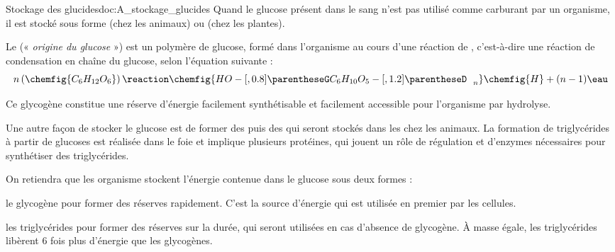 \begin{doc}{Stockage des glucides}{doc:A_stockage_glucides}
  Quand le glucose présent dans le sang n'est pas utilisé comme carburant par un organisme, il est stocké sous forme  (chez les animaux) ou  (chez les plantes).

  Le  (« \textit{origine du glucose} ») est un polymère de glucose, formé dans l'organisme au cours d'une réaction de , c'est-à-dire une réaction de condensation en chaîne du glucose, selon l'équation suivante :
  \begin{equation*}
    n \left(\chemfig{C_6 H_{12} O_6}\right) \reaction
    \chemfig{HO-[,0.8] \parentheseG C_6 H_{10} O_5 -[,1.2]\parentheseD_{\phantom{B} n}}\chemfig{H}
    + (n-1)\eau
  \end{equation*}

  Ce glycogène constitue une réserve d'énergie facilement synthétisable et facilement accessible pour l'organisme par hydrolyse.

  Une autre façon de stocker le glucose est de former des  puis des  qui seront stockés dans les  chez les animaux.
  La formation de triglycérides à partir de glucoses est réalisée dans le foie et implique plusieurs protéines, qui jouent un rôle de régulation et d'enzymes nécessaires pour synthétiser des triglycérides.

  On retiendra que les organisme stockent l'énergie contenue dans le glucose sous deux formes :
  \begin{listePoints}
    \item le glycogène pour former des réserves rapidement. C'est la source d'énergie qui est utilisée en premier par les cellules.
    \item les triglycérides pour former des réserves sur la durée, qui seront utilisées en cas d'absence de glycogène. À masse égale, les triglycérides libèrent 6 fois plus d'énergie que les glycogènes.
  \end{listePoints}
\end{doc}